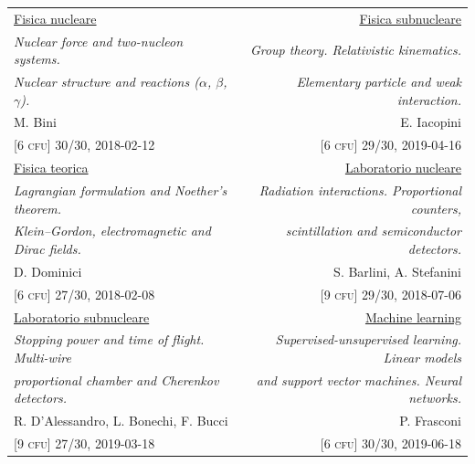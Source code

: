\documentclass[a4, 11pt]{report}
\begin{document}
\begin{tabular*}{\textwidth}{l @{\extracolsep{\fill}} r}
            {\ul {Fisica nucleare}} & {\ul {Fisica subnucleare}}\\
            {\small \emph {Nuclear force and two-nucleon systems.}} & {\small \emph {Group theory. Relativistic kinematics.}}\\
            {\small \emph {Nuclear structure and reactions ($\alpha$, $\beta$, $\gamma$).}} & {\small \emph {Elementary particle and weak interaction.}}\\
            {\small M. Bini} & {\small E. Iacopini}\\
            {\small [6 \textsc{cfu}] 30/30, 2018-02-12} & {\small [6 \textsc{cfu}] 29/30, 2019-04-16}\\ [3mm]

            {\ul {Fisica teorica}} & {\ul {Laboratorio nucleare}}\\
            {\small \emph {Lagrangian formulation and Noether's theorem.}} & {\small \emph {Radiation interactions. Proportional counters,}}\\
            {\small \emph {Klein--Gordon, electromagnetic and Dirac fields.}} & {\small \emph {scintillation and semiconductor detectors.}}\\
            {\small D. Dominici} & {\small S. Barlini, A. Stefanini}\\
            {\small [6 \textsc{cfu}] 27/30, 2018-02-08} & {\small [9 \textsc{cfu}] 29/30, 2018-07-06}\\ [3mm]

            {\ul {Laboratorio subnucleare}} & {\ul {Machine learning}}\\
            {\small \emph {Stopping power and time of flight. Multi-wire}} & {\small \emph {Supervised-unsupervised learning. Linear models}}\\
            {\small \emph {proportional chamber and Cherenkov detectors.}} & {\small \emph {and support vector machines. Neural networks.}}\\
            {\small R. D'Alessandro, L. Bonechi, F. Bucci} & {\small P. Frasconi}\\
            {\small [9 \textsc{cfu}] 27/30, 2019-03-18} & {\small [6 \textsc{cfu}] 30/30, 2019-06-18}
        \end{tabular*}
    
    \vskip 12mm
    
\end{document}
